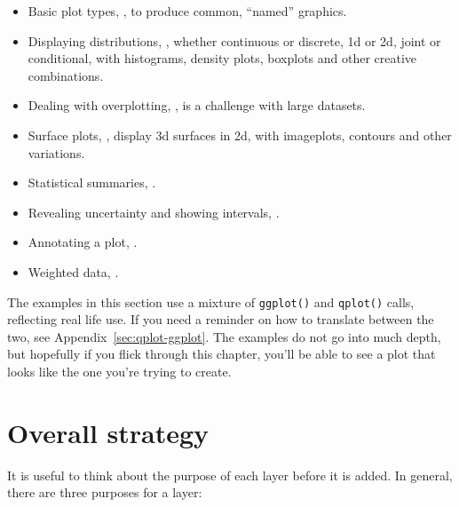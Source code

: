 \begin{itemize}
  \item Basic plot types, , to produce common, ``named'' graphics.
  
  \item Displaying distributions, , whether continuous or discrete, 1d or 2d, joint or conditional, with histograms, density plots, boxplots and other creative combinations.
  
  \item Dealing with overplotting, , is a challenge with large datasets.

  \item Surface plots, , display 3d surfaces in 2d, with imageplots, contours and other variations.

  \item Statistical summaries, .

  \item Revealing uncertainty and showing intervals, .

  \item Annotating a plot, .

  \item Weighted data, .
\end{itemize}

The examples in this section use a mixture of {\tt ggplot()} and {\tt qplot()} calls, reflecting real life use.  If you need a reminder on how to translate between the two, see Appendix~\ref{sec:qplot-ggplot}.  The examples do not go into much depth, but hopefully if you flick through this chapter, you'll be able to see a plot that looks like the one you're trying to create.

\section{Overall strategy}
\label{sec:strategy}

It is useful to think about the purpose of each layer before it is added.  In general, there are three purposes for a layer:

